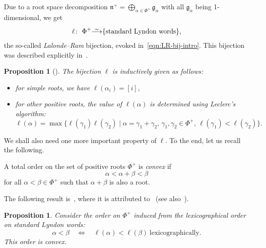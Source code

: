 \documentclass[10pt,a4paper]{amsart}
\numberwithin{equation}{section}
\newtheorem{Proposition}[Theorem]{Proposition}
 { \theoremstyle{definition}
\newtheorem{Definition}[Theorem]{Definition}
\newtheorem{Note}[Theorem]{Note}
\newtheorem{Example}[Theorem]{Example}
\newtheorem{Remark}[Theorem]{Remark} }
\newcommand{\fg}{\mathfrak{g}}
\newcommand{\fn}{\mathfrak{n}}
\newcommand{\slaws}{\text{standard Lyndon words}}
\newcommand\iso{ \vphantom{j^{X^2}}\smash{\overset{\sim}{\vphantom{\rule{0pt}{0.20em}}\smash{\longrightarrow}}} }
\begin{document}
Due to a root space decomposition $\fn^+=\bigoplus_{\alpha\in \Phi^+} \fg_\alpha$ with all $\fg_\alpha$ being 1-dimensional, we get
\begin{displaymath}
 \ell \colon\ \Phi^+ \iso \{\slaws \},
\end{displaymath}
the so-called \emph{Lalonde--Ram} bijection, evoked in~\eqref{eqn:LR-bij-intro}. This bijection was described explicitly in~\cite{L}.

\begin{Proposition}[{\cite[Proposition~25]{L}}]\label{prop:Leclerc algorithm}
The bijection $\ell$ is inductively given as follows:
\begin{itemize}\itemsep=0pt
\item[$\bullet$]
for simple roots, we have $\ell(\alpha_i)=[i]$,

\item[$\bullet$]
for other positive roots, the value of $\ell(\alpha)$ is determined using Leclerc's algorithm:
\begin{equation*}%
 \ell(\alpha) =
 \max\{ \ell(\gamma_1)\ell(\gamma_2) \mid
 \alpha=\gamma_1+\gamma_2 ,\, \gamma_1,\gamma_2\in \Phi^+ ,\, \ell(\gamma_1) < \ell(\gamma_2) \}.
\end{equation*}
\end{itemize}
\end{Proposition}

We shall also need one more important property of $\ell$. To the end, let us recall the following.

\begin{Definition}\label{def:convex}
A total order on the set of positive roots $\Phi^+$ is \textit{convex} if
\begin{displaymath}
 \alpha < \alpha+\beta < \beta
\end{displaymath}
for all $\alpha < \beta \in \Phi^+$ such that $\alpha+\beta$ is also a root.
\end{Definition}


The following result is~\cite[Proposition~28]{L}, where it is attributed to~\cite{Ro}
(see also~\cite[Proposition~2.34]{NT}).

\begin{Proposition}\label{prop:fin.convex}
Consider the order on $\Phi^+$ induced from the lexicographical order on standard Lyndon words:
\begin{equation}\label{eqn:induces}
 \alpha < \beta \quad \Longleftrightarrow \quad \ell(\alpha) < \ell(\beta) \ \mathrm{lexicographically}.
\end{equation}
This order is convex.
\end{Proposition}
\end{document}
